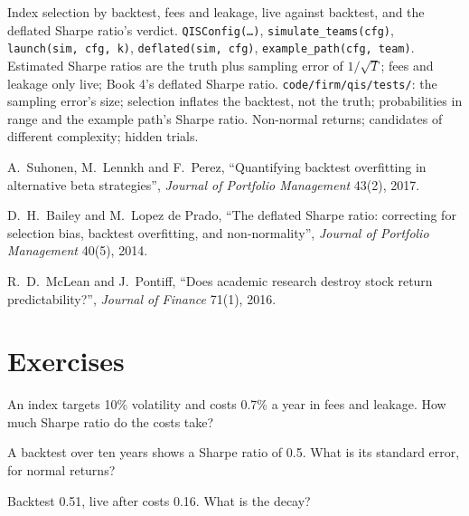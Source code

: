 \begin{build}
 Index selection by backtest, fees and leakage, live against backtest, and the deflated Sharpe ratio's verdict.
 \texttt{QISConfig(\dots)}, \texttt{simulate\_teams(cfg)}, \texttt{launch(sim, cfg, k)}, \texttt{deflated(sim, cfg)},
\texttt{example\_path(cfg, team)}.
 Estimated Sharpe ratios are the truth plus sampling error of $1/\sqrt{T}$; fees and leakage only live; Book 4's deflated Sharpe
ratio.
 \texttt{code/firm/qis/tests/}: the sampling error's size; selection inflates the backtest, not the truth; probabilities
in range and the example path's Sharpe ratio.
 Non-normal returns; candidates of different complexity; hidden trials.
\end{build}

\begin{omsources}
\item A.~Suhonen, M.~Lennkh and F.~Perez, ``Quantifying backtest overfitting in alternative beta strategies'', \emph{Journal of Portfolio Management}
43(2), 2017.
\item D.~H.~Bailey and M.~Lopez de Prado, ``The deflated Sharpe ratio: correcting for selection bias, backtest overfitting, and non-normality'',
\emph{Journal of Portfolio Management} 40(5), 2014.
\item R.~D.~McLean and J.~Pontiff, ``Does academic research destroy stock return predictability?'', \emph{Journal of Finance} 71(1), 2016.
\end{omsources}

\section{Exercises}

\begin{exercise}[$\star$]\label{exo:s2:quantitative-investment-strategies:1}
An index targets 10\% volatility and costs 0.7\% a year in fees and leakage. How much Sharpe ratio do the costs take?
\end{exercise}

\begin{exercise}[$\star$]\label{exo:s2:quantitative-investment-strategies:2}
A backtest over ten years shows a Sharpe ratio of 0.5. What is its standard error, for normal returns?
\end{exercise}

\begin{exercise}[$\star$]\label{exo:s2:quantitative-investment-strategies:3}
Backtest 0.51, live after costs 0.16. What is the decay?
\end{exercise}

